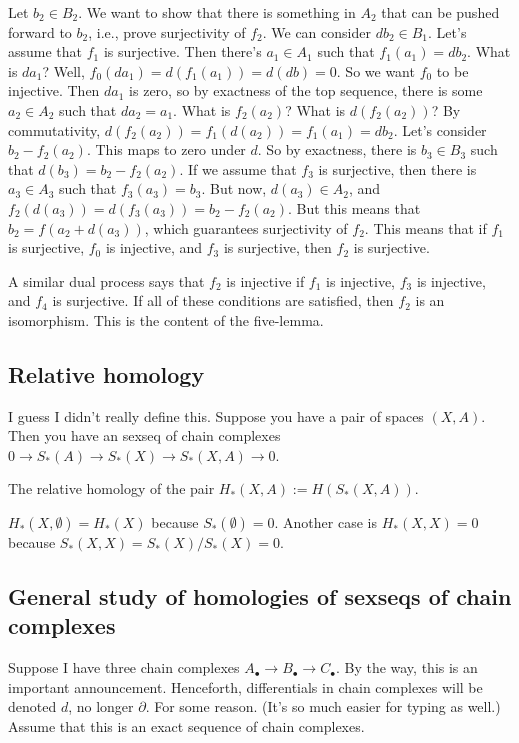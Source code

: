 Let $b_2\in B_2$. We want to show that there is something in $A_2$ that can be pushed forward to $b_2$, i.e., prove surjectivity of $f_2$. We can consider $db_2\in B_1$. Let's assume that $f_1$ is surjective. Then there's $a_1\in A_1$ such that $f_1(a_1)=db_2$. What is $da_1$? Well, $f_0(da_1)=d(f_1(a_1))=d(db)=0$. So we want $f_0$ to be injective. Then $da_1$ is zero, so by exactness of the top sequence, there is some $a_2\in A_2$ such that $da_2=a_1$. What is $f_2(a_2)$? What is $d(f_2(a_2))$? By commutativity, $d(f_2(a_2))=f_1(d(a_2))=f_1(a_1)=db_2$. Let's consider $b_2-f_2(a_2)$. This maps to zero under $d$. So by exactness, there is $b_3\in B_3$ such that $d(b_3)=b_2-f_2(a_2)$. If we assume that $f_3$ is surjective, then there is $a_3\in A_3$ such that $f_3(a_3)=b_3$. But now, $d(a_3)\in A_2$, and $f_2(d(a_3))=d(f_3(a_3))=b_2-f_2(a_2)$. But this means that $b_2=f(a_2+d(a_3))$, which guarantees surjectivity of $f_2$. This means that if $f_1$ is surjective, $f_0$ is injective, and $f_3$ is surjective, then $f_2$ is surjective.

A similar dual process says that $f_2$ is injective if $f_1$ is injective, $f_3$ is injective, and $f_4$ is surjective. If all of these conditions are satisfied, then $f_2$ is an isomorphism. This is the content of the five-lemma.
\subsection{Relative homology}
I guess I didn't really define this. Suppose you have a pair of spaces $(X,A)$. Then you have an sexseq of chain complexes $0\to S_\ast(A)\to S_\ast(X)\to S_\ast(X,A)\to 0$. 
\begin{definition}
The relative homology of the pair $ H_\ast(X,A):= H(S_\ast(X,A))$.
\end{definition}
\begin{example}
$ H_\ast(X,\emptyset)= H_\ast(X)$ because $S_\ast(\emptyset)=0$. Another case is $ H_\ast(X,X)=0$ because $S_\ast(X,X)=S_\ast(X)/S_\ast(X)=0$.
\end{example}
\subsection{General study of homologies of sexseqs of chain complexes}
Suppose I have three chain complexes $A_\bullet\to B_\bullet\to C_\bullet$. By the way, this is an important announcement. Henceforth, differentials in chain complexes will be denoted $d$, no longer $\partial$. For some reason. (It's so much easier for typing as well.) Assume that this is an exact sequence of chain complexes.

